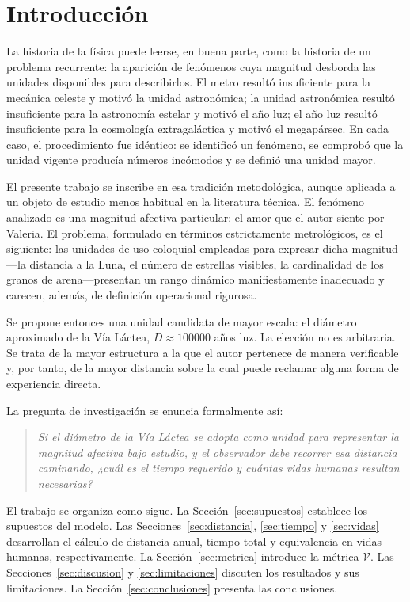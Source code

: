 \documentclass[conference]{IEEEtran}
\newcommand{\Vcoef}{\mathcal{V}}
\begin{document}
\section{Introducción}

La historia de la física puede leerse, en buena parte, como la historia de un
problema recurrente: la aparición de fenómenos cuya magnitud desborda las
unidades disponibles para describirlos. El metro resultó insuficiente para la
mecánica celeste y motivó la unidad astronómica; la unidad astronómica resultó
insuficiente para la astronomía estelar y motivó el año luz; el año luz
resultó insuficiente para la cosmología extragaláctica y motivó el
megapársec. En cada caso, el procedimiento fue idéntico: se identificó un
fenómeno, se comprobó que la unidad vigente producía números incómodos y se
definió una unidad mayor.

El presente trabajo se inscribe en esa tradición metodológica, aunque aplicada
a un objeto de estudio menos habitual en la literatura técnica. El fenómeno
analizado es una magnitud afectiva particular: el amor que el autor siente por
Valeria. El problema, formulado en términos estrictamente metrológicos, es el
siguiente: las unidades de uso coloquial empleadas para expresar dicha
magnitud---la distancia a la Luna, el número de estrellas visibles, la
cardinalidad de los granos de arena---presentan un rango dinámico manifiestamente
inadecuado y carecen, además, de definición operacional rigurosa.

Se propone entonces una unidad candidata de mayor escala: el diámetro
aproximado de la Vía Láctea, $D \approx \num{100000}$ años luz. La elección no
es arbitraria. Se trata de la mayor estructura a la que el autor pertenece de
manera verificable y, por tanto, de la mayor distancia sobre la cual puede
reclamar alguna forma de experiencia directa.

La pregunta de investigación se enuncia formalmente así:

\begin{quote}
\emph{Si el diámetro de la Vía Láctea se adopta como unidad para representar
la magnitud afectiva bajo estudio, y el observador debe recorrer esa distancia
caminando, ¿cuál es el tiempo requerido y cuántas vidas humanas resultan
necesarias?}
\end{quote}

El trabajo se organiza como sigue. La Sección~\ref{sec:supuestos} establece
los supuestos del modelo. Las Secciones~\ref{sec:distancia},
\ref{sec:tiempo} y \ref{sec:vidas} desarrollan el cálculo de distancia anual,
tiempo total y equivalencia en vidas humanas, respectivamente. La
Sección~\ref{sec:metrica} introduce la métrica $\Vcoef$. Las
Secciones~\ref{sec:discusion} y \ref{sec:limitaciones} discuten los resultados
y sus limitaciones. La Sección~\ref{sec:conclusiones} presenta las
conclusiones.
\end{document}
